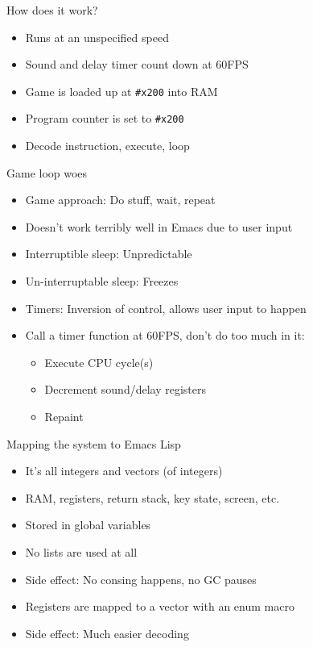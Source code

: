 \documentclass[presentation]{beamer}
\begin{document}
\begin{frame}[fragile,label={sec:org1d404e3}]{How does it work?}
 \begin{itemize}
\item Runs at an unspecified speed
\item Sound and delay timer count down at 60FPS
\item Game is loaded up at \texttt{\#x200} into RAM
\item Program counter is set to \texttt{\#x200}
\item Decode instruction, execute, loop
\end{itemize}
\end{frame}

\begin{frame}[label={sec:org30dd25d}]{Game loop woes}
\begin{itemize}
\item Game approach: Do stuff, wait, repeat
\item Doesn't work terribly well in Emacs due to user input
\item Interruptible sleep: Unpredictable
\item Un-interruptable sleep: Freezes
\item Timers: Inversion of control, allows user input to happen
\item Call a timer function at 60FPS, don't do too much in it:
\begin{itemize}
\item Execute CPU cycle(s)
\item Decrement sound/delay registers
\item Repaint
\end{itemize}
\end{itemize}
\end{frame}

\begin{frame}[label={sec:orgc5fea0b}]{Mapping the system to Emacs Lisp}
\begin{itemize}
\item It's all integers and vectors (of integers)
\item RAM, registers, return stack, key state, screen, etc.
\item Stored in global variables
\item No lists are used at all
\item Side effect: No consing happens, no GC pauses
\item Registers are mapped to a vector with an enum macro
\item Side effect: Much easier decoding
\end{itemize}
\end{frame}
\end{document}
